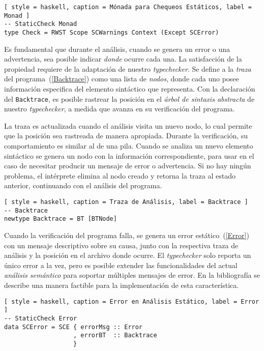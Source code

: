 \begin{lstlisting}[ style = haskell, caption = Mónada para Chequeos Estáticos, label = Monad ]
-- StaticCheck Monad
type Check = RWST Scope SCWarnings Context (Except SCError)
\end{lstlisting}


Es fundamental que durante el análisis, cuando se genera un error o una advertencia, sea posible indicar \textit{donde} ocurre cada una.
La satisfacción de la propiedad requiere de la adaptación de nuestro \textit{typechecker}.
Se define a la \textit{traza} del programa~(\ref{Backtrace}) como una lista de \textit{nodos}, donde cada uno posee información especifica del elemento sintáctico que representa.
Con la declaración del \lstinline[style = haskell]{Backtrace}, es posible rastrear la posición en el \textit{árbol de sintaxis abstracta} de nuestro \textit{typechecker}, a medida que avanza en su verificación del programa.

La traza es actualizada cuando el análisis visita un nuevo nodo, lo cual permite que la posición sea rastreada de manera apropiada.
Durante la verificación, su comportamiento es similar al de una pila.
Cuando se analiza un nuevo elemento sintáctico se genera un nodo con la información correspondiente, para usar en el caso de necesitar producir un mensaje de error o advertencia.
Si no hay ningún problema, el intérprete elimina al nodo creado y retorna la traza al estado anterior, continuando con el análisis del programa.

\begin{lstlisting}[ style = haskell, caption = Traza de Análisis, label = Backtrace ]
-- Backtrace
newtype Backtrace = BT [BTNode]
\end{lstlisting}


Cuando la verificación del programa falla, se genera un error estático~(\ref{Error}) con un mensaje descriptivo sobre su causa, junto con la respectiva traza de análisis y la posición en el archivo donde ocurre.
El \textit{typechecker} solo reporta un único error a la vez, pero es posible extender las funcionalidades del actual \textit{análisis semántico} para soportar múltiples mensajes de error.
En la bibliografía se describe una manera factible para la implementación de esta característica.

\begin{lstlisting}[ style = haskell, caption = Error en Análisis Estático, label = Error ]
-- StaticCheck Error
data SCError = SCE { errorMsg :: Error
                   , errorBT  :: Backtrace
                   }
\end{lstlisting}

